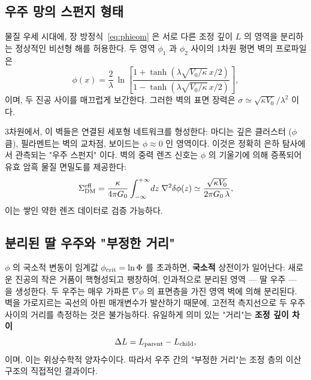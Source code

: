 \documentclass[12pt,a4paper]{article}
\begin{document}
	\subsection{우주 망의 스펀지 형태}
	물질 우세 시대에, 장 방정식~\eqref{eq:phieom} 은 서로 다른 조정 깊이 \(L\) 의 영역을 분리하는 정상적인 비선형 해를 허용한다. 두 영역 \(\phi_1\) 과 \(\phi_2\) 사이의 1차원 평면 벽의 프로파일은
	\begin{equation}
		\phi(x) = \frac{2}{\lambda}\,\ln\!\left[
		\frac{1 + \tanh(\lambda\sqrt{V_0/\kappa}\, x/2)}
		{1 - \tanh(\lambda\sqrt{V_0/\kappa}\, x/2)}
		\right],
		\label{eq:domain-wall}
	\end{equation}
	이며, 두 진공 사이를 매끄럽게 보간한다. 그러한 벽의 표면 장력은 \(\sigma \simeq \sqrt{\kappa V_0}/\lambda^2\) 이다.
	
	3차원에서, 이 벽들은 연결된 세포형 네트워크를 형성한다: 마디는 깊은 클러스터 (\(\phi\) 큼), 필라멘트는 벽의 교차점, 보이드는 \(\phi \approx 0\) 인 영역이다. 이것은 정확히 은하 탐사에서 관측되는 "우주 스펀지" 이다. 벽의 중력 렌즈 신호는 \(\phi\) 의 기울기에 의해 증폭되어 유효 암흑 물질 면밀도를 제공한다:
	\begin{equation}
		\Sigma_{\rm DM}^{\rm eff} = \frac{\kappa}{4\pi G_0} \int_{-\infty}^{+\infty} \!dz\; \nabla^2\delta\phi(z)
		\simeq \frac{\sqrt{\kappa V_0}}{2\pi G_0\,\lambda},
		\label{eq:wall-lensing}
	\end{equation}
	이는 쌓인 약한 렌즈 데이터로 검증 가능하다.
	
	\subsection{분리된 딸 우주와 "부정한 거리"}
	\(\phi\) 의 국소적 변동이 임계값 \(\phi_{\rm crit}=\ln\Phi\) 를 초과하면, \textbf{국소적} 상전이가 일어난다: 새로운 진공의 작은 거품이 핵형성되고 팽창하여, 인과적으로 분리된 영역 — 딸 우주 — 을 생성한다. 두 우주는 매우 가파른 \(\nabla\phi\) 의 표면층을 가진 영역 벽에 의해 분리된다. 벽을 가로지르는 곡선의 아핀 매개변수가 발산하기 때문에, 고전적 측지선으로 두 우주 사이의 거리를 측정하는 것은 불가능하다. 유일하게 의미 있는 "거리"는 \textbf{조정 깊이 차이}
	\begin{equation}
		\Delta L = L_{\rm parent} - L_{\rm child},
		\label{eq:deltaL}
	\end{equation}
	이며, 이는 위상수학적 양자수이다. 따라서 우주 간의 "부정한 거리"는 조정 층의 이산 구조의 직접적인 결과이다.
	
\end{document}
